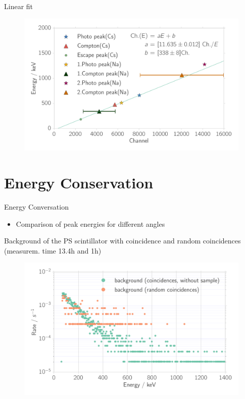\documentclass[xcolor=x11names,compress]{beamer}
\renewcommand{\(}{\begin{columns}}
\renewcommand{\)}{\end{columns}}
\newcommand{\<}[1]{\begin{column}{#1}}
\renewcommand{\>}{\end{column}}
\begin{document}
\begin{frame}[t]{Linear fit}
 \begin{figure}[htpb]
    \centering
    \includegraphics[width=1.0\linewidth]{../analysis/figures/calibration_na_linear_fit}
    \label{fig:calibration_na_linear_fit}
\end{figure}
   
\end{frame}
\section{Energy Conservation}
\begin{frame}[t]{Energy Conversation}
    \begin{itemize}
        \item Comparison of peak energies for different angles
    \end{itemize}
\end{frame}
\begin{frame}[t]{Background of the PS scintillator with coincidence
    and random coincidences (measurem. time 13.4h and 1h)}
    \begin{figure}[htpb]
    \centering
    \includegraphics[width=1.0\linewidth]{../analysis/figures/coin_background_random}
    \label{fig:coin_ps_background}
\end{figure}

\end{frame}
\end{document}

